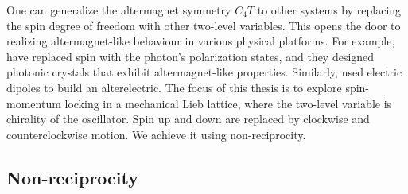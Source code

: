\documentclass[11pt, a4paper]{article} %
\begin{document}
One can generalize the altermagnet symmetry $C_4T$ to other systems by replacing the spin degree of freedom with other two-level variables.
This opens the door to realizing altermagnet-like behaviour in various physical platforms. 
For example, \cite{kim2025photonicaltermagnets} have replaced spin with the photon's polarization states, 
and they designed photonic crystals that exhibit altermagnet-like properties.
Similarly, \cite{visser2026} used electric dipoles to build an alterelectric. 
The focus of this thesis is to explore spin-momentum locking in a mechanical Lieb lattice, 
where the two-level variable is chirality of the oscillator. Spin up and down are replaced by clockwise and counterclockwise motion. 
We achieve it using non-reciprocity.

\subsection{Non-reciprocity}
\label{subsec:non-reciprocity}
\end{document}
